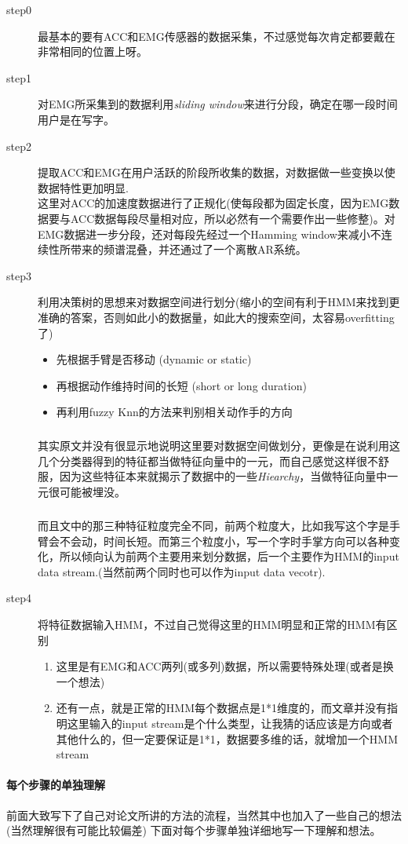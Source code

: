 \documentclass[10pt,a4paper]{article}
\begin{document}
\begin{description}
\item [step0] 最基本的要有ACC和EMG传感器的数据采集，不过感觉每次肯定都要戴在非常相同的位置上呀。
\item [step1] 对EMG所采集到的数据利用\emph{sliding window}来进行分段，确定在哪一段时间用户是在写字。
\item [step2] 提取ACC和EMG在用户活跃的阶段所收集的数据，对数据做一些变换以使数据特性更加明显. \\ 这里对ACC的加速度数据进行了正规化(使每段都为固定长度，因为EMG数据要与ACC数据每段尽量相对应，所以必然有一个需要作出一些修整)。对EMG数据进一步分段，还对每段先经过一个Hamming window来减小不连续性所带来的频谱混叠，并还通过了一个离散AR系统。
\item [step3] 利用决策树的思想来对数据空间进行划分(缩小的空间有利于HMM来找到更准确的答案，否则如此小的数据量，如此大的搜索空间，太容易overfitting了) \newline
\begin{itemize}
\item 先根据手臂是否移动 (dynamic or static)
\item 再根据动作维持时间的长短 (short or long duration)
\item 再利用fuzzy Knn的方法来判别相关动作手的方向
\end{itemize}
\subparagraph{}
其实原文并没有很显示地说明这里要对数据空间做划分，更像是在说利用这几个分类器得到的特征都当做特征向量中的一元，而自己感觉这样很不舒服，因为这些特征本来就揭示了数据中的一些\emph{Hiearchy}，当做特征向量中一元很可能被埋没。
\subparagraph{}
而且文中的那三种特征粒度完全不同，前两个粒度大，比如我写这个字是手臂会不会动，时间长短。而第三个粒度小，写一个字时手掌方向可以各种变化，所以倾向认为前两个主要用来划分数据，后一个主要作为HMM的input data stream.(当然前两个同时也可以作为input data vecotr).

\item [step4] 将特征数据输入HMM，不过自己觉得这里的HMM明显和正常的HMM有区别
\begin{enumerate}
\item 这里是有EMG和ACC两列(或多列)数据，所以需要特殊处理(或者是换一个想法)
\item 还有一点，就是正常的HMM每个数据点是1*1维度的，而文章并没有指明这里输入的input stream是个什么类型，让我猜的话应该是方向或者其他什么的，但一定要保证是1*1，数据要多维的话，就增加一个HMM stream
\end{enumerate}
\end{description}

\paragraph{每个步骤的单独理解}
前面大致写下了自己对论文所讲的方法的流程，当然其中也加入了一些自己的想法(当然理解很有可能比较偏差) 下面对每个步骤单独详细地写一下理解和想法。
\end{document}
